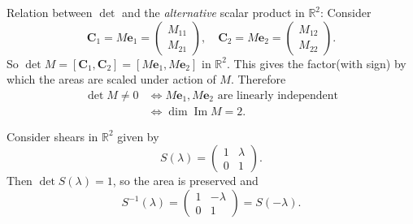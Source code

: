 \documentclass[10pt]{article}
\DeclareMathOperator{\im}{Im}
\begin{document}
    \begin{remark}
        Relation between $\det$ and the \textit{alternative} scalar product in $ \mathbb{R}^{2} $: Consider 
        \[
            \mathbf{C}_1=M \mathbf{e}_1=\begin{pmatrix}
                M_{11}\\M_{21}
            \end{pmatrix}, \quad \mathbf{C}_2=M \mathbf{e}_2=\begin{pmatrix}
                M_{12}\\M_{22}
            \end{pmatrix}
        .\] 
        So $ \det M =[\mathbf{C}_1,\mathbf{C}_2]= [M \mathbf{e}_1,M \mathbf{e}_2] $ in $ \mathbb{R}^{2} $. This gives the factor(with sign) by which the areas are scaled under action of $M$. Therefore
        \[
            \begin{aligned}
                 \det M\neq 0 & \Longleftrightarrow M \mathbf{e}_1, M \mathbf{e}_2 \text{ are linearly independent}\\
                 &\Longleftrightarrow \dim \im M=2.
            \end{aligned}
        \]
    \end{remark}
    \begin{example}
        Consider shears in $ \mathbb{R}^{2} $ given by 
        \[
            S(\lambda)=\begin{pmatrix}
                1&\lambda\\
                0&1
            \end{pmatrix}
        .\]
        Then $ \det S(\lambda)=1 $, so the area is preserved and 
        \[
            S^{-1}(\lambda)=\begin{pmatrix}
                1&-\lambda\\
                0&1
            \end{pmatrix}=S(-\lambda)
        .\]
    \end{example}
\end{document}
